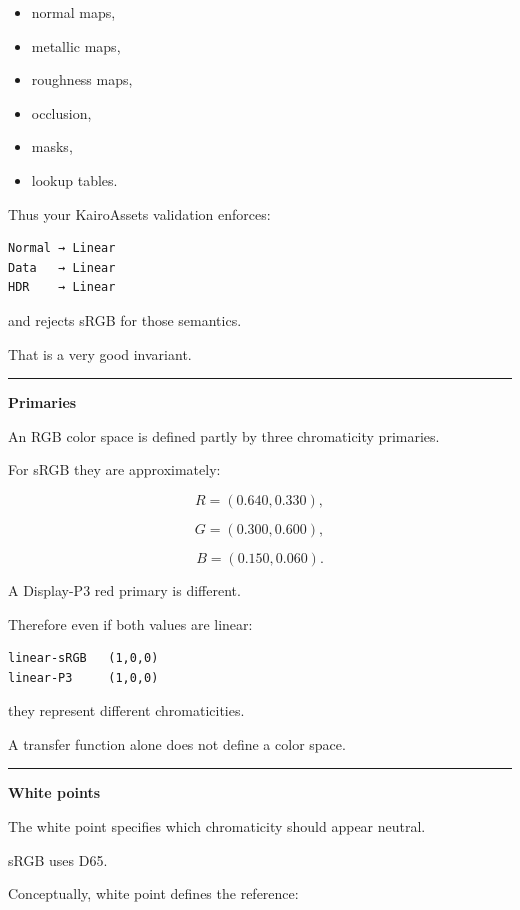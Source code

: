 \begin{itemize}
\tightlist
\item
  normal maps,
\item
  metallic maps,
\item
  roughness maps,
\item
  occlusion,
\item
  masks,
\item
  lookup tables.
\end{itemize}

Thus your KairoAssets validation enforces:

\begin{verbatim}
Normal → Linear
Data   → Linear
HDR    → Linear
\end{verbatim}

and rejects sRGB for those semantics.

That is a very good invariant.

\begin{center}\rule{0.5\linewidth}{0.5pt}\end{center}

\textbf{Primaries}

An RGB color space is defined partly by three chromaticity primaries.

For sRGB they are approximately:

\[
R=(0.640,0.330),
\]

\[
G=(0.300,0.600),
\]

\[
B=(0.150,0.060).
\]

A Display-P3 red primary is different.

Therefore even if both values are linear:

\begin{verbatim}
linear-sRGB   (1,0,0)
linear-P3     (1,0,0)
\end{verbatim}

they represent different chromaticities.

A transfer function alone does not define a color space.

\begin{center}\rule{0.5\linewidth}{0.5pt}\end{center}

\textbf{White points}

The white point specifies which chromaticity should appear neutral.

sRGB uses D65.

Conceptually, white point defines the reference:

